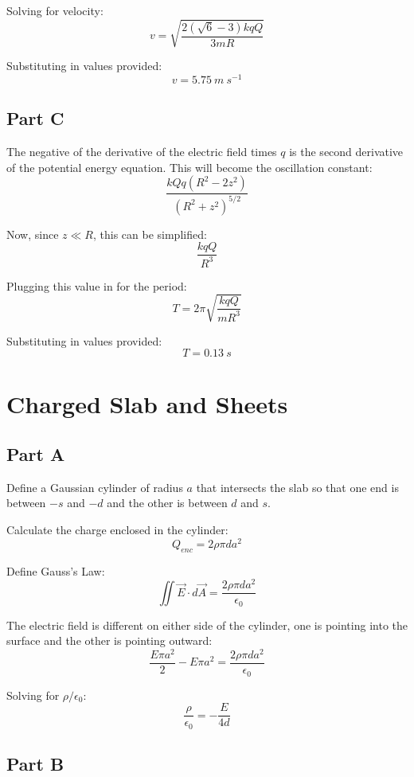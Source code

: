\documentclass{article}
\begin{document}
Solving for velocity:
$$ v = \sqrt{\frac{ 2 \left( \sqrt{6} - 3 \right) k q Q}{ 3 m R }} $$

Substituting in values provided:
$$ v = 5.75\ \si{m\ s^{-1}} $$

\subsection*{Part C}

The negative of the derivative of the electric field times $q$ is the second
derivative of the potential energy equation. This will become the oscillation
constant:
$$ \frac{ k Q q \left( R^{2} - 2 z^{2} \right) }{ \left( R^{2} + z^{2}
\right)^{5/2} } $$

Now, since $z \ll R$, this can be simplified:
$$ \frac{ k q Q }{ R^{3} } $$

Plugging this value in for the period:
$$ T = 2 \pi \sqrt{\frac{ k q Q }{ m R^{3} } } $$

Substituting in values provided:
$$ T = 0.13\ \si{s} $$

\section{ Charged Slab and Sheets }

\subsection*{Part A}

Define a Gaussian cylinder of radius $a$ that intersects the slab so that one
end is between $-s$ and $-d$ and the other is between $d$ and $s$.

\bigbreak

Calculate the charge enclosed in the cylinder:
$$ Q_{enc} = 2 \rho \pi d a^{2} $$

Define Gauss's Law:
$$ \iint \vec{E} \cdot d\vec{A} = \frac{ 2 \rho \pi d a^{2} }{ \epsilon_{0} } $$

The electric field is different on either side of the cylinder, one is pointing
into the surface and the other is pointing outward:
$$ \frac{ E \pi a^{2}}{ 2 } - E \pi a^{2} = \frac{ 2 \rho \pi d a^{2} }{
\epsilon_{0} } $$

Solving for $\rho / \epsilon_{0}$:
$$ \frac{ \rho }{ \epsilon_{0} } = -\frac{ E }{ 4 d }$$

\subsection*{Part B}
\end{document}

